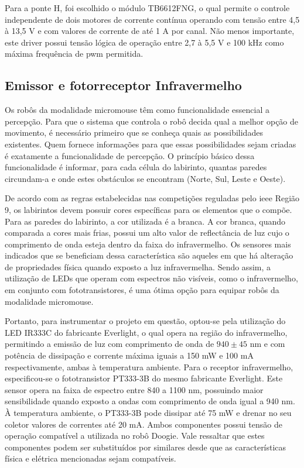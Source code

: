 Para a ponte H, foi escolhido o módulo TB6612FNG, o qual permite o controle independente de dois motores de corrente contínua operando com tensão entre 4,5 à 13,5 V e com valores de corrente de até 1 A por canal. Não menos importante, este driver possui tensão lógica de operação entre 2,7 à 5,5 V e 100 kHz como máxima frequência de \gls*{pwm} permitida.

\subsection{Emissor e fotorreceptor Infravermelho}
\label{ssec:emissor_e_fotoreceptor_ir}
Os robôs da modalidade micromouse têm como funcionalidade essencial a percepção. Para que o sistema que controla  o robô decida qual a melhor opção de movimento, é necessário primeiro que se conheça quais as possibilidades existentes. Quem fornece informações para que essas possibilidades sejam criadas é exatamente a funcionalidade de percepção. O princípio básico dessa funcionalidade  é informar, para cada célula do labirinto, quantas paredes circundam-a e onde estes obstáculos se encontram (Norte, Sul, Leste e Oeste).

De acordo com as regras estabelecidas nas competições reguladas pelo \gls*{ieee} Região 9, os labirintos devem possuir cores específicas para os elementos que o compõe. Para as paredes do labirinto, a cor utilizada é a branca. A cor branca, quando comparada a cores mais frias, possui um alto valor de reflectância de luz cujo o comprimento de onda esteja dentro da faixa do infravermelho. Os sensores mais indicados que se beneficiam dessa característica são aqueles em que há alteração de propriedades física quando exposto a luz infravermelha. Sendo assim, a utilização de LEDs que operam com espectros não visíveis, como o infravermelho, em conjunto com fototransistores, é uma ótima opção para equipar robôs da modalidade micromouse.

Portanto, para instrumentar o projeto em questão, optou-se pela utilização do LED IR333C do fabricante Everlight, o qual opera na região do infravermelho, permitindo a emissão de luz com comprimento de onda de $940 \pm 45$ nm e com potência de dissipação e corrente máxima iguais a 150 mW e 100 mA respectivamente, ambas à temperatura ambiente. Para o receptor infravermelho, especificou-se o fototransistor PT333-3B do mesmo fabricante Everlight. Este sensor opera na faixa de espectro entre 840 a 1100 nm, possuindo maior sensibilidade quando exposto a ondas com comprimento de onda igual a 940 nm. À temperatura ambiente, o PT333-3B pode dissipar até 75 mW e drenar no seu coletor valores de correntes até 20 mA. Ambos componentes possui tensão de operação compatível a utilizada no robô Doogie. Vale ressaltar que estes componentes podem ser substituídos por similares desde que as características física e elétrica mencionadas sejam compatíveis.

